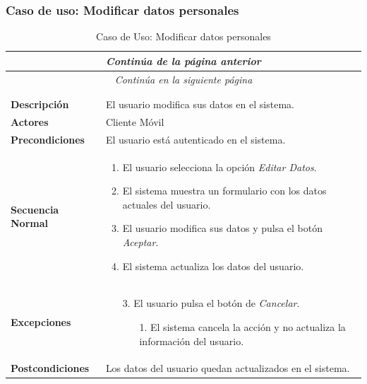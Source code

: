 \subsubsection*{Caso de uso: Modificar datos personales }
\begin{longtable}{| p{4cm} | p{10cm} |}
\endfirsthead
\multicolumn{2}{c}{\textit{Continúa de la página anterior}}\\[12pt]
\hline
\endhead
\hline
\multicolumn{2}{c}{\textit{Continúa en la siguiente página}} \\
\endfoot
\hline
\caption{Caso de Uso: Modificar datos personales}\label{fig:1}\\
\endlastfoot


\hline
\multicolumn{2}{|c|}{\textbf{CU$<$21$>$ - Modificar Datos Personales}} \\

\hline
\textbf{Descripción} &
El usuario modifica sus datos en el sistema.\\

\hline
\textbf{Actores} &
Cliente Móvil\\

\hline
\textbf{Precondiciones} &
El usuario está autenticado en el sistema.\\

\hline
\textbf{Secuencia Normal} &\mbox{}\par\vspace{-\baselineskip}
\begin{enumerate}[leftmargin=0.7cm, topsep=0.1cm]
\item El usuario selecciona la opción \textit{Editar Datos}.
\item El sistema muestra un formulario con los datos actuales del usuario.
\item El usuario modifica sus datos y pulsa el botón \textit{Aceptar}.
\item El sistema actualiza los datos del usuario.
\end{enumerate}


\\
\hline
\textbf{Excepciones} &\mbox{}\par\vspace{-\baselineskip}
\begin{enumerate}[leftmargin=0.9cm, topsep=0.1cm]
\item[3.] El usuario pulsa el botón de \textit{Cancelar}.
	\begin{itemize}
	\item[1.] El sistema cancela la acción y no actualiza la información del usuario.
	\end{itemize}
\end{enumerate}
\\

\hline
\textbf{Postcondiciones} & 
Los datos del usuario quedan actualizados en el sistema.\\
\hline
\end{longtable}




